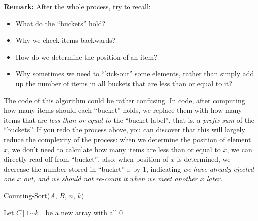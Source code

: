 \begin{spacing}{1.3}
    \begin{remark}
        {\bf Remark:} After the whole process, try to recall:
        \begin{itemize}
            \item What do the ``buckets'' hold?
            \item Why we check items backwards?
            \item How do we determine the position of an item?
            \item Why sometimes we need to ``kick-out'' some elements, rather 
            than simply add up the number of items in all buckets that are less than 
            or equal to it?
        \end{itemize}
    \end{remark}

    The code of this algorithm could be rather confusing. 
    In code, after computing how many items should each ``bucket'' holds, we 
    replace them with how many items that are {\it less than or equal to} the 
    ``bucket label'', that is, a {\it prefix sum} of the ``buckets''.
    If you redo the process above, you can discover that this will largely 
    reduce the complexity of the process: when we determine the position of 
    element $x$, we don't need to calculate how many items are less than or equal to $x$,
    we can directly read off from ``bucket'', also, when position of $x$ is determined,
    we decrease the number stored in ``bucket'' $x$ by 1, indicating {\it we have 
    already ejected one $x$ out, and we should not re-count it when we meet another 
    $x$ later}.
    
    \newpage
    \begin{algorithm*}
        \caption{Counting-Sort($A$, $B$, $n$, $k$)}

        Let $C[1\cdots k]$ be a new array with all 0




\end{algorithm*}
\end{spacing}
